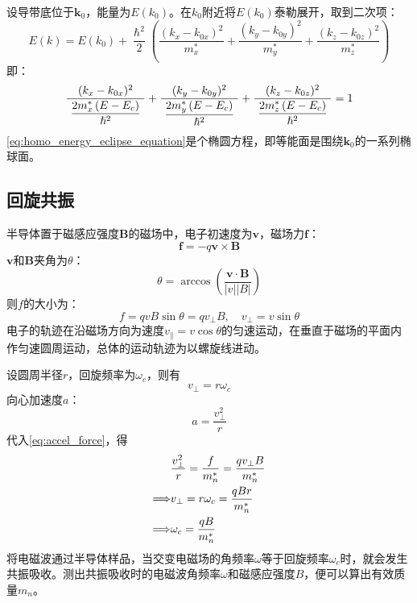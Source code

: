 设导带底位于$\bm k_0$，能量为$E(k_0)$。在$k_0$附近将$E(k_0)$泰勒展开，取到二次项：
\begin{equation}
    E(k)=E(k_0)+\frac{\hslash^2}{2}\left(\frac{(k_x-k_{0x})^2}{m_x^*}+\frac{(k_y-k_{0y})^2}{m_y^*}+\frac{(k_z-k_{0z})^2}{m_z^*}\right)
    \label{eq:homo_energy_equation}
\end{equation}
即： 
\begin{equation}
    \frac{\quad(k_x-k_{0x})^2\quad}{\displaystyle \frac{2m_x^*\left(E-E_c\right)}{\hslash^2}}+
    \frac{\quad(k_y-k_{0y})^2\quad}{\displaystyle \frac{2m_y^*\left(E-E_c\right)}{\hslash^2}}+
    \frac{\quad(k_z-k_{0z})^2\quad}{\displaystyle \frac{2m_z^*\left(E-E_c\right)}{\hslash^2}}=1
    \label{eq:homo_energy_eclipse_equation}
\end{equation}
\autoref{eq:homo_energy_eclipse_equation}是个椭圆方程，即等能面是围绕$\bm k_0$的一系列椭球面。

\subsection{回旋共振}

半导体置于磁感应强度$\bm B$的磁场中，电子初速度为$\bm v$，磁场力$\bm f$：
\begin{equation}
    \bm f=-q\bm v\times\bm B
\end{equation}
$\bm v$和$\bm B$夹角为$\theta$：
\begin{equation}
    \theta=\arccos{\left(\frac{\bm v\cdot\bm B}{\left|v\right|\left|B\right|}\right)}
\end{equation}
则$f$的大小为：
\begin{equation}
    f=qvB\sin{\theta}=qv_{\perp}B,\quad v_{\perp}=v\sin{\theta}
\end{equation}
电子的轨迹在沿磁场方向为速度$v_{\parallel}=v\cos{\theta}$的匀速运动，在垂直于磁场的平面内作匀速圆周运动，总体的运动轨迹为以螺旋线进动。

设圆周半径$r$，回旋频率为$\omega_c$，则有
\begin{equation}
    v_{\perp}=r\omega_c
\end{equation}
向心加速度$a$：
\begin{equation}
    a=\frac{v_{\perp}^2}{r}
\end{equation}
代入\autoref{eq:accel_force}，得
\begin{align}
    &\frac{v_{\perp}^2}{r}=\frac{f}{m_n^{*}}=\frac{qv_{\perp}B}{m_n^*}\notag\\
    \Longrightarrow&v_{\perp}=r\omega_c=\frac{qBr}{m_n^*}\notag\\
    \Longrightarrow&\omega_c=\frac{qB}{m_n^*}\label{eq:ball-cyclotron-resonance}
\end{align}
将电磁波通过半导体样品，当交变电磁场的角频率$\omega$等于回旋频率$\omega_c$时，就会发生共振吸收。测出共振吸收时的电磁波角频率$\omega$和磁感应强度$B$，便可以算出有效质量$m_n$。

